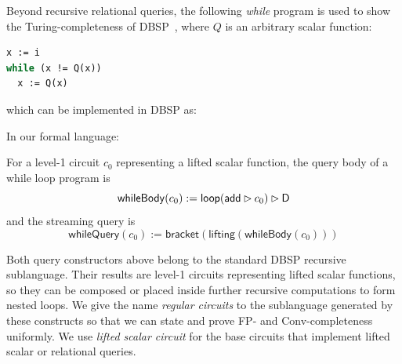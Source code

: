 Beyond recursive relational queries, the following \emph{while} program is used to show the Turing-completeness of DBSP~\cite{budiu2025dbsp}, where $Q$ is an arbitrary scalar function:
{\footnotesize
\begin{lstlisting}[language=Pascal]
x := i
while (x != Q(x))
  x := Q(x)
\end{lstlisting}
}
which can be implemented in DBSP as:
\begin{center}
\end{center}
In our formal language:
\begin{definition}
    For a level-1 circuit $c_0$ representing a lifted scalar function, the query body of a while loop program is
    \[\mathsf{whileBody}(c_0) := \mathsf{loop}(\mathsf{add} \mathbin{\vartriangleright} c_0) \mathbin{\vartriangleright} \mathsf{D}\]
    and the streaming query is
    \[\mathsf{whileQuery}(c_0) := \mathsf{bracket}(\mathsf{lifting}(\mathsf{whileBody}(c_0)))\]
\end{definition}

Both query constructors above belong to the standard DBSP recursive sublanguage. Their results are level-1 circuits representing lifted scalar functions, so they can be composed or placed inside further recursive computations to form nested loops. We give the name \emph{regular circuits} to the sublanguage generated by these constructs so that we can state and prove FP- and Conv-completeness uniformly. We use \emph{lifted scalar circuit} for the base circuits that implement lifted scalar or relational queries.

